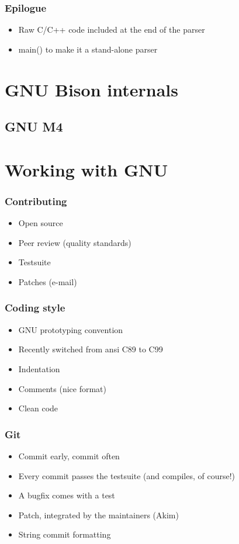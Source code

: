 \documentclass{beamer}
\begin{document}
\begin{frame}
  \frametitle{Epilogue}
    \begin{itemize}[<+->]
      \item Raw C/C++ code included at the end of the parser
      \item main() to make it a stand-alone parser
    \end{itemize}
\end{frame}

\section{GNU Bison internals}

\subsection{GNU M4}

\begin{frame}
\end{frame}

\section{Working with GNU}

\begin{frame}
  \frametitle{Contributing}
    \begin{itemize}[<+->]
      \item Open source
      \item Peer review (quality standards)
      \item Testsuite
      \item Patches (e-mail)
    \end{itemize}
\end{frame}

\begin{frame}
  \frametitle{Coding style}
    \begin{itemize}[<+->]
      \item GNU prototyping convention
      \item Recently switched from ansi C89 to C99
      \item Indentation
      \item Comments (nice format)
      \item Clean code
    \end{itemize}
\end{frame}

\begin{frame}
  \frametitle{Git}
    \begin{itemize}[<+->]
      \item Commit early, commit often
      \item Every commit passes the testsuite (and compiles, of course!)
      \item A bugfix comes with a test
      \item Patch, integrated by the maintainers (Akim)
      \item String commit formatting
    \end{itemize}
\end{frame}
\end{document}

